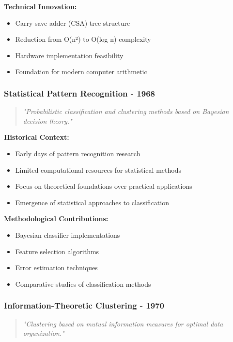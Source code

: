 \textbf{Technical Innovation:}
\begin{itemize}
    \item Carry-save adder (CSA) tree structure
    \item Reduction from O(n²) to O(log n) complexity
    \item Hardware implementation feasibility
    \item Foundation for modern computer arithmetic
\end{itemize}

\subsubsection{Statistical Pattern Recognition - 1968}

\begin{quote}
\textit{"Probabilistic classification and clustering methods based on Bayesian decision theory."}
\end{quote}

\textbf{Historical Context:}
\begin{itemize}
    \item Early days of pattern recognition research
    \item Limited computational resources for statistical methods
    \item Focus on theoretical foundations over practical applications
    \item Emergence of statistical approaches to classification
\end{itemize}

\textbf{Methodological Contributions:}
\begin{itemize}
    \item Bayesian classifier implementations
    \item Feature selection algorithms
    \item Error estimation techniques
    \item Comparative studies of classification methods
\end{itemize}

\subsubsection{Information-Theoretic Clustering - 1970}

\begin{quote}
\textit{"Clustering based on mutual information measures for optimal data organization."}
\end{quote}

